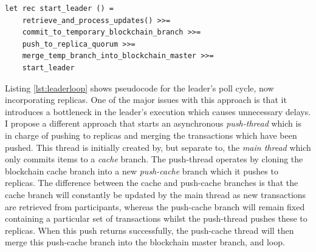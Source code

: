 \documentclass[12pt,a4paper,twoside,openright]{report}
\begin{document}
	\begin{lstlisting}[caption={Naive Leader Loop},label={lst:leaderloop}]
let rec start_leader () = 
	retrieve_and_process_updates() >>= 
	commit_to_temporary_blockchain_branch >>=
	push_to_replica_quorum >>=
	merge_temp_branch_into_blockchain_master >>=
	start_leader
	\end{lstlisting}

	Listing \ref{lst:leaderloop} shows pseudocode for the leader's poll cycle, now incorporating replicas. 
	One of the major issues with this approach is that it introduces a bottleneck in the leader's execution which causes unnecessary delays.
	I propose a different approach that starts an asynchronous \textit{push-thread} which is in charge of pushing to replicas and merging the transactions which have been pushed.
	This thread is initially created by, but separate to, the \textit{main thread} which only commits items to a \textit{cache} branch.
	The push-thread operates by cloning the blockchain cache branch into a new \textit{push-cache} branch which it pushes to replicas.
	The difference between the cache and push-cache branches is that the cache branch will constantly be updated by the main thread as new transactions are retrieved from participants, whereas the push-cache branch will remain fixed containing a particular set of transactions whilst the push-thread pushes these to replicas. 
	When this push returns successfully, the push-cache thread will then merge this push-cache branch into the blockchain master branch, and loop. 
\end{document}
